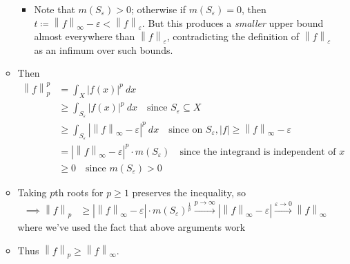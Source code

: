 \begin{solution}
\begin{itemize}
\begin{itemize}
    \begin{itemize}
    \tightlist
    \item
      Note that \(m(S_{\varepsilon}) > 0\); otherwise if
      \(m(S_{\varepsilon}) = 0\), then
      \(t\coloneqq{\left\lVert {f} \right\rVert}_\infty - {\varepsilon}< {\left\lVert {f} \right\rVert}_{\varepsilon}\).
      But this produces a \emph{smaller} upper bound almost everywhere
      than \({\left\lVert {f} \right\rVert}_{\varepsilon}\),
      contradicting the definition of
      \({\left\lVert {f} \right\rVert}_{\varepsilon}\) as an infimum
      over such bounds.
    \end{itemize}
  \item
    Then
    \begin{align*}
    {\left\lVert {f} \right\rVert}_p^p 
    &= \int_X {\left\lvert {f(x)} \right\rvert}^p ~dx \\
    &\geq \int_{S_\varepsilon} {\left\lvert {f(x)} \right\rvert}^p ~dx \quad\text{since } S_{\varepsilon}\subseteq X \\
    &\geq \int_{S_\varepsilon} {\left\lvert {{\left\lVert {f} \right\rVert}_\infty - \varepsilon} \right\rvert}^p ~dx \quad\text{since on } S_{\varepsilon}, {\left\lvert {f} \right\rvert} \geq {\left\lVert {f} \right\rVert}_\infty - {\varepsilon}\\
    &= {\left\lvert {{\left\lVert {f} \right\rVert}_\infty - \varepsilon} \right\rvert}^p \cdot m(S_\varepsilon) \quad\text{since the integrand is independent of }x \\
    & \geq 0 \quad\text{since } m(S_{\varepsilon}) > 0
    \end{align*}
  \item
    Taking \(p\)th roots for \(p\geq 1\) preserves the inequality, so
    \begin{align*}
    \implies {\left\lVert {f} \right\rVert}_p &\geq {\left\lvert {{\left\lVert {f} \right\rVert}_\infty - \varepsilon} \right\rvert} \cdot m(S_\varepsilon)^{\frac 1 p} 
    \overset{p\to\infty}\longrightarrow{\left\lvert {{\left\lVert {f} \right\rVert}_\infty - \varepsilon} \right\rvert} 
    \overset{\varepsilon \to 0}\longrightarrow{\left\lVert {f} \right\rVert}_\infty
    \end{align*}
    where we've used the fact that above arguments work
  \item
    Thus
    \({\left\lVert {f} \right\rVert}_p \geq {\left\lVert {f} \right\rVert}_\infty\).
  \end{itemize}
\end{itemize}

\end{solution}

